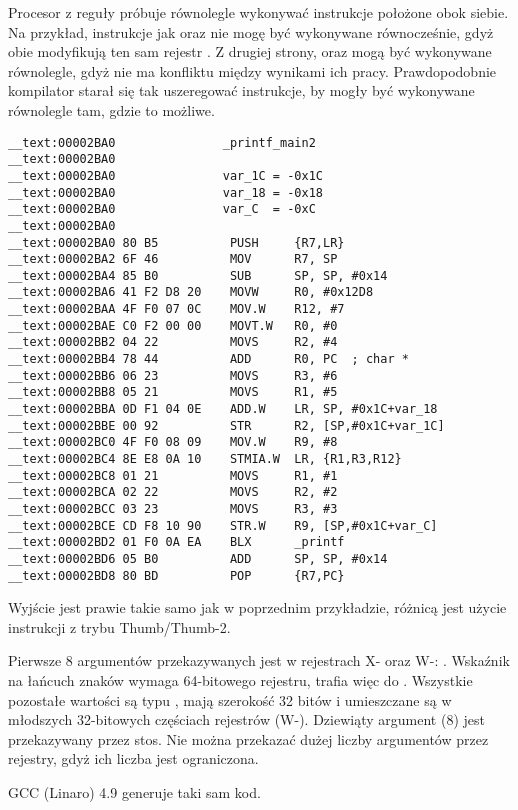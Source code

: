 Procesor z reguły próbuje równolegle wykonywać instrukcje położone obok siebie. Na przykład, instrukcje jak  oraz
 nie mogę być wykonywane równocześnie, gdyż obie modyfikują ten sam rejestr .
Z drugiej strony,  oraz 
mogą być wykonywane równolegle, gdyż nie ma konfliktu między wynikami ich pracy.
Prawdopodobnie kompilator starał się tak uszeregować instrukcje, by mogły być wykonywane równolegle tam, gdzie to możliwe.
 
\myparagraph{\OptimizingXcodeIV: \ThumbTwoMode}

\begin{lstlisting}[style=customasmARM]
__text:00002BA0               _printf_main2
__text:00002BA0
__text:00002BA0               var_1C = -0x1C
__text:00002BA0               var_18 = -0x18
__text:00002BA0               var_C  = -0xC
__text:00002BA0
__text:00002BA0 80 B5          PUSH     {R7,LR}
__text:00002BA2 6F 46          MOV      R7, SP
__text:00002BA4 85 B0          SUB      SP, SP, #0x14
__text:00002BA6 41 F2 D8 20    MOVW     R0, #0x12D8
__text:00002BAA 4F F0 07 0C    MOV.W    R12, #7
__text:00002BAE C0 F2 00 00    MOVT.W   R0, #0
__text:00002BB2 04 22          MOVS     R2, #4
__text:00002BB4 78 44          ADD      R0, PC  ; char *
__text:00002BB6 06 23          MOVS     R3, #6
__text:00002BB8 05 21          MOVS     R1, #5
__text:00002BBA 0D F1 04 0E    ADD.W    LR, SP, #0x1C+var_18
__text:00002BBE 00 92          STR      R2, [SP,#0x1C+var_1C]
__text:00002BC0 4F F0 08 09    MOV.W    R9, #8
__text:00002BC4 8E E8 0A 10    STMIA.W  LR, {R1,R3,R12}
__text:00002BC8 01 21          MOVS     R1, #1
__text:00002BCA 02 22          MOVS     R2, #2
__text:00002BCC 03 23          MOVS     R3, #3
__text:00002BCE CD F8 10 90    STR.W    R9, [SP,#0x1C+var_C]
__text:00002BD2 01 F0 0A EA    BLX      _printf
__text:00002BD6 05 B0          ADD      SP, SP, #0x14
__text:00002BD8 80 BD          POP      {R7,PC}
\end{lstlisting}

Wyjście jest prawie takie samo jak w poprzednim przykładzie, różnicą jest użycie instrukcji z trybu Thumb/Thumb-2.





Pierwsze 8 argumentów przekazywanych jest w rejestrach X- oraz W-: \ARMPCS.
Wskaźnik na łańcuch znaków wymaga 64-bitowego rejestru, trafia więc do .
Wszystkie pozostałe wartości są typu \Tint, mają szerokość 32 bitów i umieszczane są w młodszych 32-bitowych częściach rejestrów (W-).
Dziewiąty argument (8) jest przekazywany przez stos.
Nie można przekazać dużej liczby argumentów przez rejestry, gdyż ich liczba jest ograniczona.

\Optimizing GCC (Linaro) 4.9 generuje taki sam kod.
